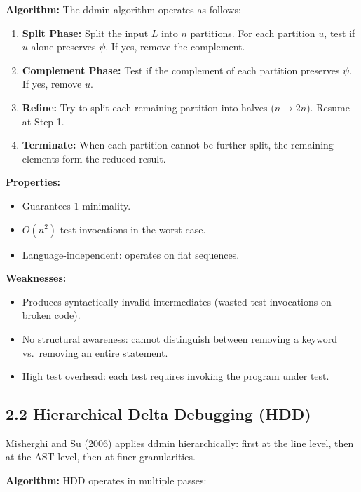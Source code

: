 \documentclass[
  letterpaper,
]{article}
\providecommand{\tightlist}{%
  \setlength{\itemsep}{0pt}\setlength{\parskip}{0pt}}
\begin{document}
\textbf{Algorithm:} The ddmin algorithm operates as follows:

\begin{enumerate}
\def\labelenumi{\arabic{enumi}.}
\tightlist
\item
  \textbf{Split Phase:} Split the input \(L\) into \(n\) partitions. For
  each partition \(u\), test if \(u\) alone preserves \(\psi\). If yes,
  remove the complement.
\item
  \textbf{Complement Phase:} Test if the complement of each partition
  preserves \(\psi\). If yes, remove \(u\).
\item
  \textbf{Refine:} Try to split each remaining partition into halves
  (\(n \to 2n\)). Resume at Step 1.
\item
  \textbf{Terminate:} When each partition cannot be further split, the
  remaining elements form the reduced result.
\end{enumerate}

\textbf{Properties:}

\begin{itemize}
\tightlist
\item
  Guarantees 1-minimality.
\item
  \(O(n^2)\) test invocations in the worst case.
\item
  Language-independent: operates on flat sequences.
\end{itemize}

\textbf{Weaknesses:}

\begin{itemize}
\tightlist
\item
  Produces syntactically invalid intermediates (wasted test invocations
  on broken code).
\item
  No structural awareness: cannot distinguish between removing a keyword
  vs.~removing an entire statement.
\item
  High test overhead: each test requires invoking the program under
  test.
\end{itemize}

\subsection{2.2 Hierarchical Delta Debugging
(HDD)}\label{hierarchical-delta-debugging-hdd}

Misherghi and Su (2006) applies ddmin hierarchically: first at the line
level, then at the AST level, then at finer granularities.

\textbf{Algorithm:} HDD operates in multiple passes:
\end{document}
